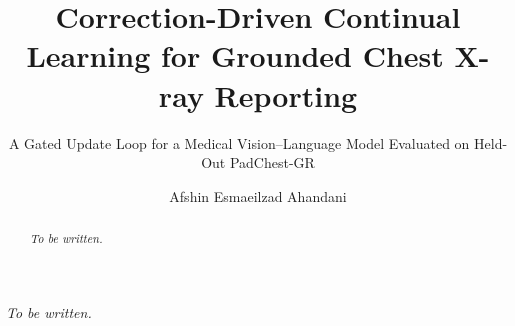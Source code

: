 \documentclass[master,english,lof,lot]{tvthesis}
\title{Correction-Driven Continual Learning for Grounded Chest X-ray Reporting}
\subtitle{A Gated Update Loop for a Medical Vision--Language Model Evaluated on Held-Out PadChest-GR}
\author{Afshin Esmaeilzad Ahandani}
\begin{document}
\maketitle

\frontmatter


\begin{acknowledgments}
\emph{To be written.}
\end{acknowledgments}

\begin{abstract}
\emph{To be written.}
\end{abstract}

\tableofcontents

\mainmatter







\appendix


\backmatter


\end{document}
